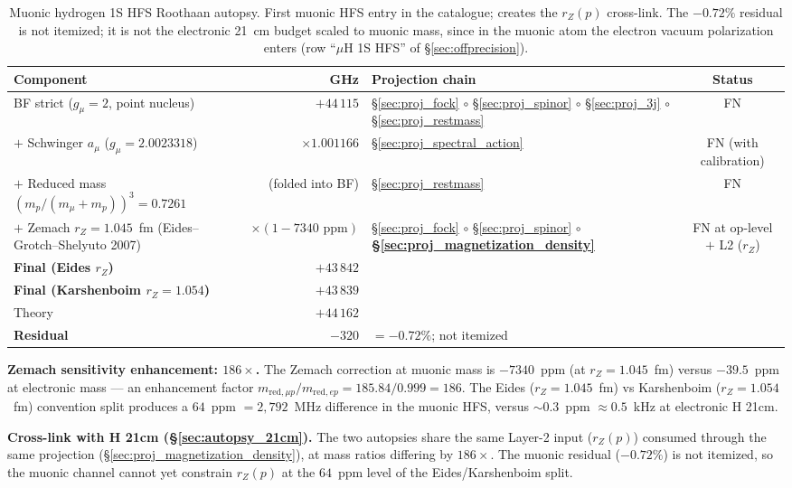 \documentclass[11pt]{article}
\begin{document}
\begin{table}[h]
\centering\small
\begin{tabular}{p{4.5cm} r p{5.5cm} c}
\toprule
Component & GHz & Projection chain & Status \\
\midrule
BF strict ($g_\mu = 2$, point nucleus) & $+44\,115$ &
\S\ref{sec:proj_fock} $\circ$ \S\ref{sec:proj_spinor} $\circ$
\S\ref{sec:proj_3j} $\circ$ \S\ref{sec:proj_restmass}
& FN \\
$+$ Schwinger $a_\mu$ ($g_\mu = 2.0023318$) & $\times 1.001166$ &
\S\ref{sec:proj_spectral_action} & FN (with calibration) \\
$+$ Reduced mass $(m_p/(m_\mu+m_p))^3 = 0.7261$ &
(folded into BF) &
\S\ref{sec:proj_restmass} & FN \\
$+$ Zemach $r_Z = 1.045$~fm (Eides--Grotch--Shelyuto 2007) & $\times(1 - 7340\text{~ppm})$ &
\S\ref{sec:proj_fock} $\circ$ \S\ref{sec:proj_spinor} $\circ$
\textbf{\S\ref{sec:proj_magnetization_density}} & FN at op-level $+$ L2 ($r_Z$) \\
\midrule
\textbf{Final (Eides $r_Z$)} & $+43\,842$ & & \\
\textbf{Final (Karshenboim $r_Z = 1.054$)} & $+43\,839$ & & \\
Theory~\cite{hagelstein_lensky_pascalutsa2023} & $+44\,162$ & & \\
\textbf{Residual} & $-320$ & $= -0.72\%$; not itemized & \\
\bottomrule
\end{tabular}
\caption{Muonic hydrogen 1S HFS Roothaan autopsy.  First muonic HFS
entry in the catalogue; creates the $r_Z(p)$ cross-link.  The
$-0.72\%$ residual is not itemized; it is not the electronic 21~cm
budget scaled to muonic mass, since in the muonic atom the electron
vacuum polarization enters (row ``$\mu$H 1S HFS'' of
\S\ref{sec:offprecision}).}
\label{tab:autopsy_muh_hfs}
\end{table}

\textbf{Zemach sensitivity enhancement: $186\times$.}  The Zemach
correction at muonic mass is $-7340$~ppm (at $r_Z = 1.045$~fm) versus
$-39.5$~ppm at electronic mass --- an enhancement factor
$m_{\text{red},\mu p}/m_{\text{red},ep} = 185.84/0.999 = 186$.  The
Eides ($r_Z = 1.045$~fm) vs Karshenboim ($r_Z = 1.054$~fm) convention
split produces a $64$~ppm $= 2{,}792$~MHz difference in the muonic HFS,
versus $\sim 0.3$~ppm $\approx 0.5$~kHz at electronic H 21cm.

\textbf{Cross-link with H 21cm (\S\ref{sec:autopsy_21cm}).}  The two
autopsies share the same Layer-2 input ($r_Z(p)$) consumed through the
same projection (\S\ref{sec:proj_magnetization_density}), at mass ratios
differing by $186\times$.  The muonic residual ($-0.72\%$) is not
itemized, so the muonic channel cannot yet constrain $r_Z(p)$ at the
$64$~ppm level of the Eides/Karshenboim split.
\end{document}
